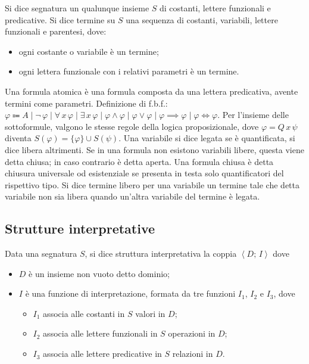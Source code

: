 \documentclass[10pt]{article}
\begin{document}
        \newpage

        Si dice segnatura un qualunque insieme \(S\) di costanti, lettere funzionali e predicative. Si dice termine su \(S\) una
        sequenza di costanti, variabili, lettere funzionali e parentesi, dove:
        \begin{itemize}
            \item ogni costante o variabile è un termine;
            \item ogni lettera funzionale con i relativi parametri è un termine.
        \end{itemize}
        Una formula atomica è una formula composta da una lettera predicativa, avente termini come parametri.
        Definizione di f.b.f.: \(\varphi \Coloneqq A \; | \; \neg \, \varphi \; | \; \forall \, x \, \varphi \; | \; \exists \, x \, \varphi \; | \; \varphi \land \varphi \; | \; \varphi \lor \varphi \; | \; \varphi \implies \varphi \; | \; \varphi \iff \varphi\).
        Per l'insieme delle sottoformule, valgono le stesse regole della logica proposizionale, dove
        \(\varphi = Q \, x \, \psi\) diventa \(S(\varphi) = \{\varphi\} \cup S(\psi)\).
        Una variabile si dice legata se è quantificata, si dice libera altrimenti. Se in una formula non esistono variabili libere,
        questa viene detta chiusa; in caso contrario è detta aperta. Una formula chiusa è detta chiusura universale od esistenziale se
        presenta in testa solo quantificatori del rispettivo tipo. Si dice termine libero per una variabile un termine tale che detta
        variabile non sia libera quando un'altra variabile del termine è legata.

        \subsection*{Strutture interpretative}

            Data una segnatura \(S\), si dice struttura interpretativa la coppia \(\left<D; \, I\right>\) dove
            \begin{itemize}
                \item \(D\) è un insieme non vuoto detto dominio;
                \item \(I\) è una funzione di interpretazione, formata da tre funzioni \(I_1\), \(I_2\) e \(I_3\), dove
                    \begin{itemize}
                        \item \(I_1\) associa alle costanti in \(S\) valori in \(D\);
                        \item \(I_2\) associa alle lettere funzionali in \(S\) operazioni in \(D\);
                        \item \(I_3\) associa alle lettere predicative in \(S\) relazioni in \(D\).
                    \end{itemize}
            \end{itemize}
\end{document}
